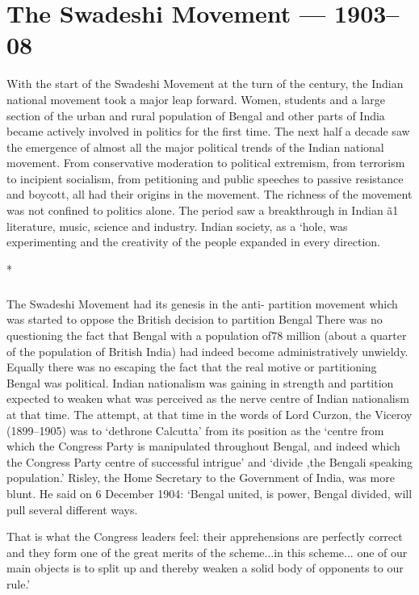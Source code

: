 \chapter{The Swadeshi Movement --- 1903--08}\label{chapter:CH10}

With the start of the Swadeshi Movement at the turn of the century, the Indian national movement took a major leap forward. Women, students and a large section of the urban and rural population of Bengal and other parts of India became actively involved in politics for the first time. The next half a decade saw the emergence of almost all the major political trends of the Indian national movement. From conservative moderation to political extremism, from terrorism to incipient socialism, from petitioning and public speeches to passive resistance and boycott, all had their origins in the movement. The richness of the movement was not confined to politics alone. The period saw a breakthrough in Indian ã1 literature, music, science and industry. Indian society, as a `hole, was experimenting and the creativity of the people expanded in every direction.

\begin{center}*\end{center}

\paragraph*{}
The Swadeshi Movement had its genesis in the anti- partition movement which was started to oppose the British decision to partition Bengal There was no questioning the fact that Bengal with a population of78 million (about a quarter of the population of British India) had indeed become administratively unwieldy. Equally there was no escaping the fact that the real motive or partitioning Bengal was political. Indian nationalism was gaining in strength and partition expected to weaken what was perceived as the nerve centre of Indian nationalism at that time. The attempt, at that time in the words of Lord Curzon, the Viceroy (1899--1905) was to `dethrone Calcutta' from its position as the `centre from which the Congress Party is manipulated throughout Bengal, and indeed which the Congress Party centre of successful intrigue' and `divide ,the Bengali speaking population.' Risley, the Home Secretary to the Government of India, was more blunt. He said on 6 December 1904: `Bengal united, is power, Bengal divided, will pull several different ways.

That is what the Congress leaders feel: their apprehensions are perfectly correct and they form one of the great merits of the scheme...in this scheme... one of our main objects is to split up and thereby weaken a solid body of opponents to our rule.'

